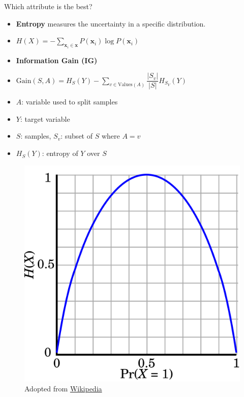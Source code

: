\documentclass[serif, aspectratio=169]{beamer}
\begin{document}
\begin{frame}{Which attribute is the best?}
    \begin{itemize}
        \itemsep1em
        \justifying
        \item \textbf{Entropy} measures the uncertainty in a specific distribution.
        \item[] \begin{center}
            $H(X) = -\displaystyle\sum_{\boldsymbol{x}_i \in \boldsymbol{x}} P(\boldsymbol{x}_i)\log P(\boldsymbol{x}_i)$
        \end{center}
        \item \textbf{Information Gain (IG)}
        \item[] \begin{center}
            $\text{Gain}(S, A) = H_S(Y) - \displaystyle\sum_{v \in \text{Values}(A)} \dfrac{\vert S_v\vert}{\vert S\vert}H_{S_V}(Y)$
        \end{center}
    \end{itemize}
    \begin{itemize}
        \itemsep0.25em
        \justifying
        \item[] $A$: variable used to split samples
        \item[] $Y$: target variable
        \item[] $S$: samples, \qquad $S_v$: subset of $S$ where $A = v$
        \item[] $H_S(Y)$: entropy of $Y$ over $S$
    \end{itemize}
    \endminipage
    \hfill
    \begin{figure}[!htb]
        \includegraphics[width=\linewidth]{pic/entropy.png}
        {\scriptsize Adopted from \href{https://en.wikipedia.org/wiki/Binary_entropy_function}{Wikipedia}}
    \end{figure}
    \endminipage
\end{frame}
\end{document}
